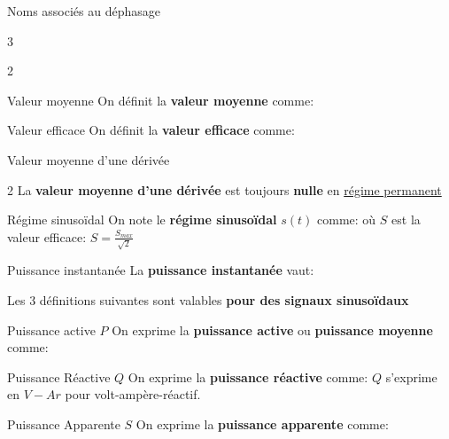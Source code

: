 \documentclass{article} %
\begin{document}
{\begin{vocabulaire}{Noms associés au déphasage}
\begin{multicols}{3}
\end{multicols}
\end{vocabulaire}
\pagebreak
\begin{multicols}{2}
\begin{definition}{Valeur moyenne}
On définit la \textbf{valeur moyenne} comme:
\end{definition}
\begin{definition}[label=val_eff]{Valeur efficace}
On définit la \textbf{valeur efficace} comme:
\end{definition}
\end{multicols}
\begin{propriété}{Valeur moyenne d'une dérivée}
\begin{multicols}{2}
La \textbf{valeur moyenne d'une dérivée} est toujours \textbf{nulle} en \underline{régime permanent} 
\end{multicols}
\end{propriété}
\begin{definition}{Régime sinusoïdal}
On note le \textbf{régime sinusoïdal} $s(t)$ comme:
où $S$ est la valeur efficace: $S=\frac{S_{max}}{\sqrt{2}}$
\end{definition}
{}
\begin{definition}{Puissance instantanée}
La \textbf{puissance instantanée} vaut:
\end{definition}
\noindent Les 3 définitions suivantes sont valables \textbf{pour des signaux sinusoïdaux}
\begin{definition}{Puissance active $P$}
On exprime la \textbf{puissance active} ou \textbf{puissance moyenne} comme:
\end{definition}
\begin{definition}{Puissance Réactive $Q$}
On exprime la \textbf{puissance réactive} comme:
$Q$ s'exprime en $V-Ar$ pour volt-ampère-réactif.
\end{definition}
\begin{definition}{Puissance Apparente $S$}
On exprime la \textbf{puissance apparente} comme:
\end{definition}\pagebreak
}
\end{document}
